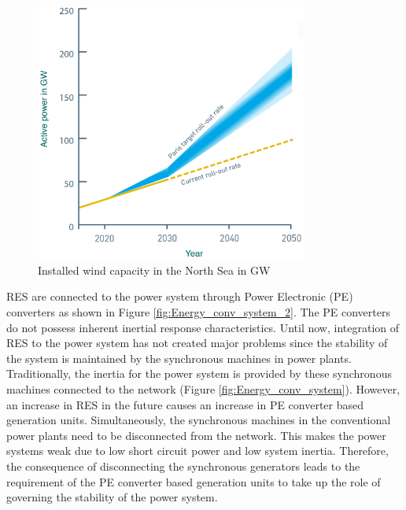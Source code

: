 \begin{figure}[H]
\centering
    \includegraphics[height = 8.5cm,width = 9cm]{Diagrams/Chapter_1/Paris.pdf}
    \caption{Installed wind capacity in the North Sea in GW \cite{noauthor_vision_2020}}
    \label{fig:Paris_roll_out}
\end{figure}

\gls{RES} are connected to the power system through Power Electronic (\gls{PE}) converters as shown in Figure \ref{fig:Energy_conv_system_2}. The \gls{PE} converters do not possess inherent inertial response characteristics. Until now, integration of \gls{RES} to the power system has not created major problems since the stability of the system is maintained by the synchronous machines in power plants. Traditionally, the inertia for the power system is provided by these synchronous machines connected to the network (Figure \ref{fig:Energy_conv_system}). However, an increase in \gls{RES} in the future causes an increase in \gls{PE} converter based generation units. Simultaneously, the synchronous machines in the conventional power plants need to be disconnected from the network. This makes the power systems weak due to low short circuit power and low system inertia. Therefore, the consequence of disconnecting the synchronous generators leads to the requirement of the \gls{PE} converter based generation units to take up the role of governing the stability of the power system.

